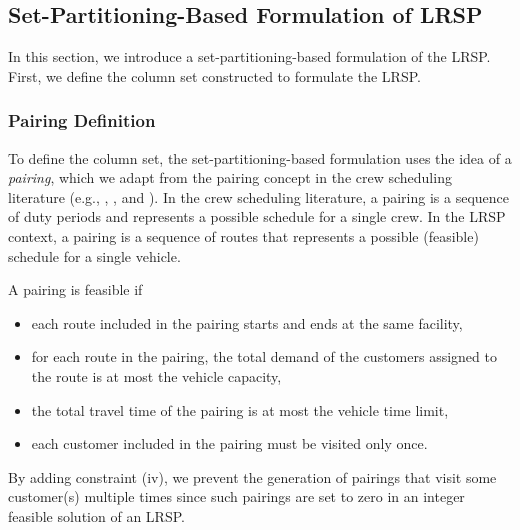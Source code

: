 \subsection{Set-Partitioning-Based Formulation of LRSP}
\label{set-part-form}
In this section, we introduce a set-partitioning-based formulation of 
the LRSP. First, we define the column set constructed to formulate
the LRSP. 
 
\subsubsection{Pairing Definition}
To define the column set, the set-partitioning-based formulation 
uses the idea of a {\em pairing}, which we adapt from the pairing concept in the 
crew scheduling literature (e.g., \citet{Desrosiers}, \citet{Vance}, and \citet{Anbil}).
In the crew scheduling literature, a pairing is a sequence of duty periods 
and represents  a possible schedule for a single crew. In the LRSP context, 
a pairing is a sequence of routes that represents a possible (feasible) schedule for a 
single vehicle.

A pairing is feasible if 
\begin{itemize}
\item [i.] each route included in the pairing starts and ends at the 
same facility, 
\item [ii.]for each route in the pairing, the total demand of the 
customers assigned to the route is at most the vehicle capacity, 
\item [iii.] the total travel time of the pairing is at most the vehicle time limit,
\item [iv.] each customer included in the pairing must be visited only once.
\end{itemize}
By adding constraint (iv), we prevent the generation of pairings that
visit some customer(s) multiple times since such pairings are set 
to zero in an integer feasible solution of an LRSP.

